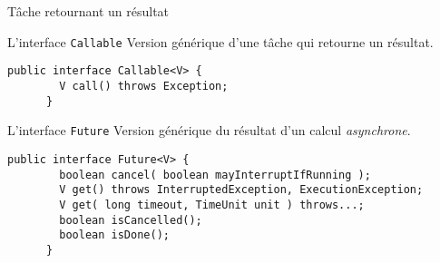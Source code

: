 
\begingroup

\begin{frame}[fragile]{Tâche retournant un résultat}

  \begin{block}{L'interface \lstinline{Callable}}
    Version générique d'une tâche qui retourne un résultat.

    \begin{lstlisting}[gobble=6]
      public interface Callable<V> {
        V call() throws Exception;
      }
    \end{lstlisting}
  \end{block}
  
  \bigskip

  \begin{block}{L'interface \lstinline{Future}}
    Version générique du résultat d'un calcul \textit{asynchrone}. 

    \begin{lstlisting}[gobble=6]
      public interface Future<V> {
        boolean cancel( boolean mayInterruptIfRunning );
        V get() throws InterruptedException, ExecutionException;
        V get( long timeout, TimeUnit unit ) throws...;
        boolean isCancelled();
        boolean isDone();
      }
    \end{lstlisting}
  \end{block}
\end{frame}

\endgroup
\endinput
